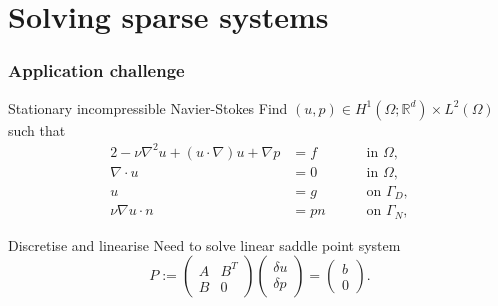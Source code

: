 \documentclass[presentation]{beamer}
\newcommand{\honev}{\ensuremath{{H}^1(\Omega; \mathbb{R}^d)}\xspace}
\newcommand{\ltwo}{\ensuremath{{L}^2(\Omega)}\xspace}
\newcommand{\advect}[2]{\ensuremath{(#2 \cdot \nabla) #1}}
\begin{document}
\section{Solving sparse systems}

\begin{frame}
  \frametitle{Application challenge}
  \begin{block}{Stationary incompressible Navier-Stokes}
    Find $(u, p) \in \honev \times \ltwo$ such that
    \begin{alignat*}{2}
      -  \nu \nabla^2 u + \advect{u}{u} + \nabla p &= f \quad && \text{ in } \Omega, \label{eqn:momentum} \\
      \nabla \cdot u &= 0 \quad && \text{ in } \Omega, \\
      u &= g \quad && \text{ on } \Gamma_D, \\
      \nu \nabla u \cdot n &= pn \quad && \text{ on } \Gamma_N,
    \end{alignat*}
  \end{block}
  \begin{block}{Discretise and linearise}
    Need to solve linear saddle point system
    \begin{equation*}
      P := \begin{pmatrix}
        A & B^T \\
        B & 0
      \end{pmatrix}
      \begin{pmatrix}
        \delta u \\ \delta p
      \end{pmatrix}
      =
      \begin{pmatrix}
        b \\ 0
      \end{pmatrix}.
    \end{equation*}
  \end{block}
\end{frame}
\end{document}
